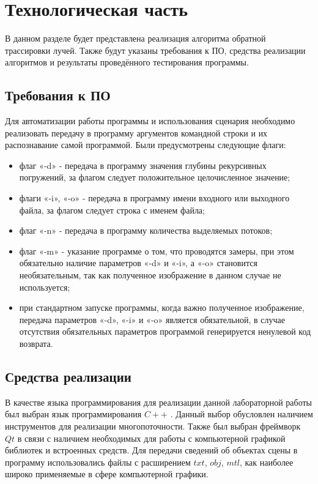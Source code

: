 \chapter{Технологическая часть}

В данном разделе будет представлена реализация алгоритма обратной трассировки лучей. Также будут указаны требования к ПО, средства реализации алгоритмов и результаты проведённого тестирования программы.

\section{Требования к ПО}
Для автоматизации работы программы и использования сценария необходимо реализовать передачу в программу аргументов командной строки и их распознавание самой программой. Были предусмотрены следующие флаги:

\begin{itemize}
	\item флаг «-d» - передача в программу значения глубины рекурсивных погружений, за флагом следует положительное целочисленное значение;
	\item флаги «-i», «-o» - передача в программу имени входного или выходного файла, за флагом следует строка с именем файла;
	\item флаг «-n» - передача в программу количества выделяемых потоков;
	\item флаг «-m» - указание программе о том, что проводятся замеры, при этом обязательно наличие параметров «-d» и «-i», а «-o» становится необязательным, так как полученное изображение в данном случае не используется;
	\item при стандартном запуске программы, когда важно полученное изображение, передача параметров «-d», «-i» и «-o» является обязательной, в случае отсутствия обязательных параметров программой генерируется ненулевой код возврата.
\end{itemize}

\section{Средства реализации}
В качестве языка программирования для реализации данной лабораторной работы был выбран язык программирования $C++$ \cite{web_item4}. Данный выбор обусловлен наличием инструментов для реализации многопоточности. Также был выбран фреймворк $Qt$ \cite{web_item2} в связи с наличием необходимых для работы с компьютерной графикой библиотек и встроенных средств. Для передачи сведений об объектах сцены в программу использовались файлы с расширением $txt$, $obj$, $mtl$, как наиболее широко применяемые в сфере компьютерной графики.

